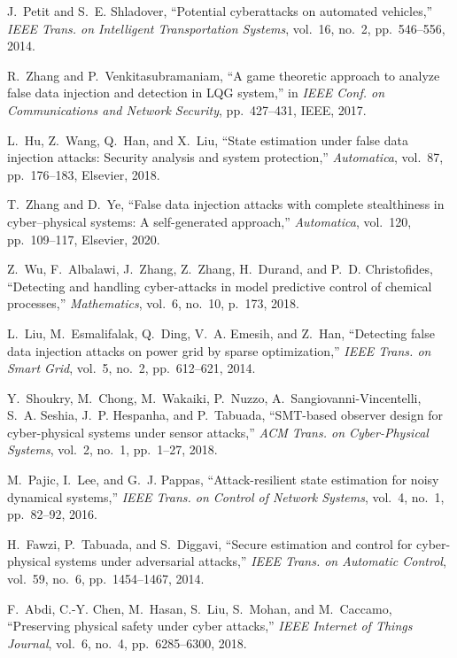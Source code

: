 \documentclass[journal]{IEEEtran}
\begin{document}
\begin{thebibliography}{10}
J.~Petit and S.~E. Shladover, ``Potential cyberattacks on automated vehicles,''
  {\em IEEE Trans. on Intelligent Transportation Systems}, vol.~16, no.~2,
  pp.~546--556, 2014.

R.~Zhang and P.~Venkitasubramaniam, ``A game theoretic approach to analyze
  false data injection and detection in {LQG} system,'' in {\em IEEE Conf. on
  Communications and Network Security}, pp.~427--431, IEEE, 2017.
  
L.~Hu, Z.~Wang, Q.~Han, and X.~Liu, ``State estimation under false data injection attacks: Security analysis and system protection,'' {\em Automatica}, vol.~87, pp.~176--183, Elsevier, 2018.

T.~Zhang and D.~Ye, ``False data injection attacks with complete stealthiness in cyber--physical systems: A self-generated approach,'' {\em Automatica}, vol.~120, pp.~109--117, Elsevier, 2020.

Z.~Wu, F.~Albalawi, J.~Zhang, Z.~Zhang, H.~Durand, and P.~D. Christofides,
  ``Detecting and handling cyber-attacks in model predictive control of
  chemical processes,'' {\em Mathematics}, vol.~6, no.~10, p.~173, 2018.

L.~Liu, M.~Esmalifalak, Q.~Ding, V.~A. Emesih, and Z.~Han, ``Detecting false
  data injection attacks on power grid by sparse optimization,'' {\em IEEE
  Trans. on Smart Grid}, vol.~5, no.~2, pp.~612--621, 2014.

Y.~Shoukry, M.~Chong, M.~Wakaiki, P.~Nuzzo, A.~Sangiovanni-Vincentelli, S.~A.
  Seshia, J.~P. Hespanha, and P.~Tabuada, ``{SMT}-based observer design for
  cyber-physical systems under sensor attacks,'' {\em ACM Trans. on
  Cyber-Physical Systems}, vol.~2, no.~1, pp.~1--27, 2018.

M.~Pajic, I.~Lee, and G.~J. Pappas, ``Attack-resilient state estimation for
  noisy dynamical systems,'' {\em IEEE Trans. on Control of Network Systems},
  vol.~4, no.~1, pp.~82--92, 2016.

H.~Fawzi, P.~Tabuada, and S.~Diggavi, ``Secure estimation and control for
  cyber-physical systems under adversarial attacks,'' {\em IEEE Trans. on
  Automatic Control}, vol.~59, no.~6, pp.~1454--1467, 2014.

F.~Abdi, C.-Y. Chen, M.~Hasan, S.~Liu, S.~Mohan, and M.~Caccamo, ``Preserving
  physical safety under cyber attacks,'' {\em IEEE Internet of Things Journal},
  vol.~6, no.~4, pp.~6285--6300, 2018.


\end{thebibliography}
\end{document}
